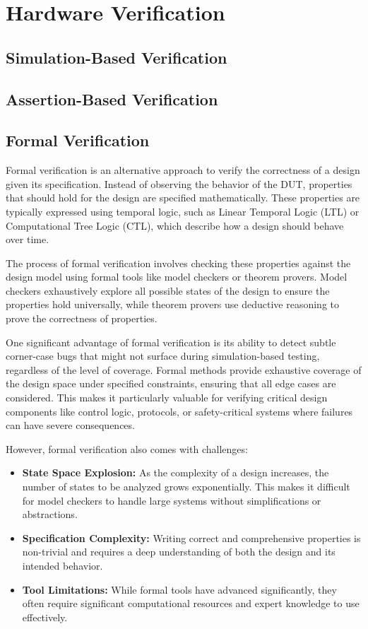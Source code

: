\documentclass[12pt]{book}
\begin{document}
\section{Hardware Verification}

\subsection{Simulation-Based Verification}

\subsection{Assertion-Based Verification}

\subsection{Formal Verification}

Formal verification is an alternative approach to verify the correctness of a design given its specification. Instead
of observing the behavior of the DUT, properties that should hold for the design are specified mathematically. These
properties are typically expressed using temporal logic, such as Linear Temporal Logic (LTL) or Computational Tree
Logic (CTL), which describe how a design should behave over time.

The process of formal verification involves checking these properties against the design model using formal tools
like model checkers or theorem provers. Model checkers exhaustively explore all possible states of the design to
ensure the properties hold universally, while theorem provers use deductive reasoning to prove the correctness of properties.

One significant advantage of formal verification is its ability to detect subtle corner-case bugs that might not
surface during simulation-based testing, regardless of the level of coverage. Formal methods provide exhaustive
coverage of the design space under specified constraints, ensuring that all edge cases are considered. This makes it
particularly valuable for verifying critical design components like control logic, protocols, or safety-critical
systems where failures can have severe consequences.

However, formal verification also comes with challenges:
\begin{itemize}
  \item \textbf{State Space Explosion:} As the complexity of a design increases, the number of states to be analyzed
    grows exponentially. This makes it difficult for model checkers to handle large systems without simplifications
    or abstractions.
  \item \textbf{Specification Complexity:} Writing correct and comprehensive properties is non-trivial and requires a
    deep understanding of both the design and its intended behavior.
  \item \textbf{Tool Limitations:} While formal tools have advanced significantly, they often require significant
    computational resources and expert knowledge to use effectively.
\end{itemize}
\end{document}
